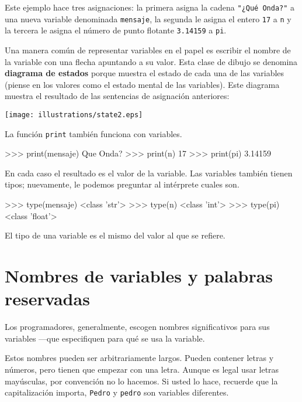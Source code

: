 Este ejemplo hace tres asignaciones: la primera asigna la cadena
{\verb+"¿Qué Onda?"+} a una nueva variable denominada \texttt{mensaje}, 
la segunda le asigna el entero \texttt{17} a \texttt{n} y la tercera le
asigna el número de punto flotante \texttt{3.14159} a \texttt{pi}.


Una manera común de representar variables en el papel es escribir el nombre
de la variable con una flecha apuntando a su valor. Esta clase de dibujo se
denomina  {\bf diagrama de estados} porque muestra el estado de cada una de 
las variables (piense en los valores como el estado mental de las variables).
Este diagrama muestra el resultado de las sentencias de asignación anteriores:

\beforefig
	\centerline{\texttt{[image: illustrations/state2.eps]}}
\afterfig

La función \texttt{print} también funciona con variables.

\beforeverb
\begin{pyconcode}
>>> print(mensaje)
Que Onda?
>>> print(n)
17
>>> print(pi)
3.14159
\end{pyconcode}
\afterverb
%

En cada caso el resultado es el valor de la variable.
Las variables también tienen tipos; nuevamente, le podemos preguntar 
al intérprete cuales son.

\beforeverb
\begin{pyconcode}
>>> type(mensaje)
<class 'str'>
>>> type(n)
<class 'int'>
>>> type(pi)
<class 'float'>
\end{pyconcode}
\afterverb
%

El tipo de una variable es el mismo del valor al que se refiere.


\section{Nombres de variables y palabras reservadas}

Los programadores, generalmente, escogen nombres significativos para
sus variables ---que especifiquen para qué se usa la variable.


Estos nombres pueden ser arbitrariamente largos. Pueden contener
letras y números, pero tienen que empezar con una letra. Aunque 
es legal usar letras mayúsculas, por convención no lo hacemos. Si
usted lo hace, recuerde que la capitalización importa, \texttt{Pedro}
y \texttt{pedro} son variables diferentes.

